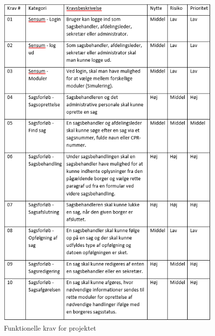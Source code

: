 \begin{figure}[hbt!]
  \includegraphics[scale = 0.9]{./PNG/krav/krav.PNG} 
  \caption{Funktionelle krav for projektet}
  \label{fig:krav}
\end{figure}

